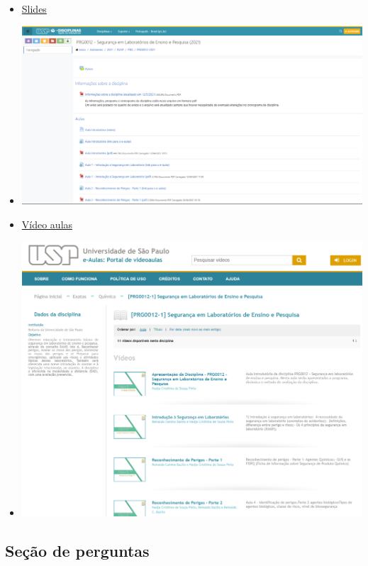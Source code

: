 \documentclass[
  letterpaper,
  DIV=11,
  numbers=noendperiod]{scrartcl}
\providecommand{\tightlist}{%
  \setlength{\itemsep}{0pt}\setlength{\parskip}{0pt}}\usepackage{longtable,booktabs,array}
\begin{document}
\begin{itemize}
\tightlist
\item
  \href{https://edisciplinas.usp.br/course/view.php?id=84617}{Slides}
\item
  \includegraphics[width=6.25in,height=\textheight,keepaspectratio]{imagens/usp01.png}
\end{itemize}

\begin{itemize}
\tightlist
\item
  \href{https://eaulas.usp.br/portal/course.action?course=24746}{Vídeo
  aulas}
\item
  \includegraphics[width=5.20833in,height=\textheight,keepaspectratio]{imagens/usp02.png}
\end{itemize}

\subsection{Seção de perguntas}\label{seuxe7uxe3o-de-perguntas-1}
\end{document}
